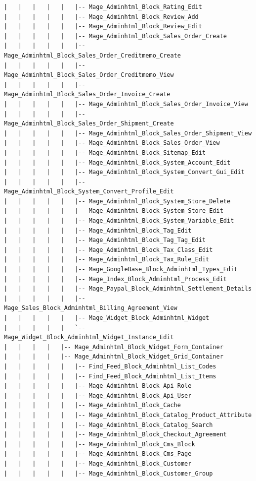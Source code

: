 \documentclass[oneside]{book}
\begin{document}
\begin{lstlisting}
|   |   |   |   |   |-- Mage_Adminhtml_Block_Rating_Edit
|   |   |   |   |   |-- Mage_Adminhtml_Block_Review_Add
|   |   |   |   |   |-- Mage_Adminhtml_Block_Review_Edit
|   |   |   |   |   |-- Mage_Adminhtml_Block_Sales_Order_Create
|   |   |   |   |   |-- Mage_Adminhtml_Block_Sales_Order_Creditmemo_Create
|   |   |   |   |   |-- Mage_Adminhtml_Block_Sales_Order_Creditmemo_View
|   |   |   |   |   |-- Mage_Adminhtml_Block_Sales_Order_Invoice_Create
|   |   |   |   |   |-- Mage_Adminhtml_Block_Sales_Order_Invoice_View
|   |   |   |   |   |-- Mage_Adminhtml_Block_Sales_Order_Shipment_Create
|   |   |   |   |   |-- Mage_Adminhtml_Block_Sales_Order_Shipment_View
|   |   |   |   |   |-- Mage_Adminhtml_Block_Sales_Order_View
|   |   |   |   |   |-- Mage_Adminhtml_Block_Sitemap_Edit
|   |   |   |   |   |-- Mage_Adminhtml_Block_System_Account_Edit
|   |   |   |   |   |-- Mage_Adminhtml_Block_System_Convert_Gui_Edit
|   |   |   |   |   |-- Mage_Adminhtml_Block_System_Convert_Profile_Edit
|   |   |   |   |   |-- Mage_Adminhtml_Block_System_Store_Delete
|   |   |   |   |   |-- Mage_Adminhtml_Block_System_Store_Edit
|   |   |   |   |   |-- Mage_Adminhtml_Block_System_Variable_Edit
|   |   |   |   |   |-- Mage_Adminhtml_Block_Tag_Edit
|   |   |   |   |   |-- Mage_Adminhtml_Block_Tag_Tag_Edit
|   |   |   |   |   |-- Mage_Adminhtml_Block_Tax_Class_Edit
|   |   |   |   |   |-- Mage_Adminhtml_Block_Tax_Rule_Edit
|   |   |   |   |   |-- Mage_GoogleBase_Block_Adminhtml_Types_Edit
|   |   |   |   |   |-- Mage_Index_Block_Adminhtml_Process_Edit
|   |   |   |   |   |-- Mage_Paypal_Block_Adminhtml_Settlement_Details
|   |   |   |   |   |-- Mage_Sales_Block_Adminhtml_Billing_Agreement_View
|   |   |   |   |   |-- Mage_Widget_Block_Adminhtml_Widget
|   |   |   |   |   `-- Mage_Widget_Block_Adminhtml_Widget_Instance_Edit
|   |   |   |   |-- Mage_Adminhtml_Block_Widget_Form_Container
|   |   |   |   |-- Mage_Adminhtml_Block_Widget_Grid_Container
|   |   |   |   |   |-- Find_Feed_Block_Adminhtml_List_Codes
|   |   |   |   |   |-- Find_Feed_Block_Adminhtml_List_Items
|   |   |   |   |   |-- Mage_Adminhtml_Block_Api_Role
|   |   |   |   |   |-- Mage_Adminhtml_Block_Api_User
|   |   |   |   |   |-- Mage_Adminhtml_Block_Cache
|   |   |   |   |   |-- Mage_Adminhtml_Block_Catalog_Product_Attribute
|   |   |   |   |   |-- Mage_Adminhtml_Block_Catalog_Search
|   |   |   |   |   |-- Mage_Adminhtml_Block_Checkout_Agreement
|   |   |   |   |   |-- Mage_Adminhtml_Block_Cms_Block
|   |   |   |   |   |-- Mage_Adminhtml_Block_Cms_Page
|   |   |   |   |   |-- Mage_Adminhtml_Block_Customer
|   |   |   |   |   |-- Mage_Adminhtml_Block_Customer_Group

\end{lstlisting}
\end{document}
